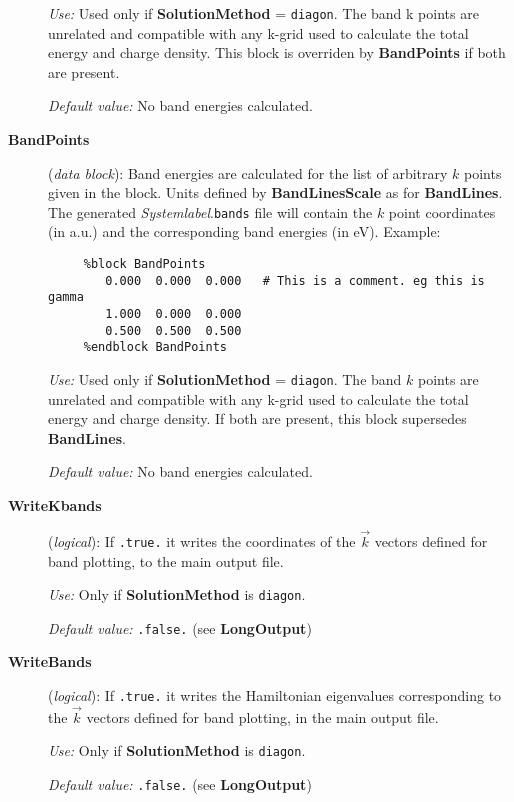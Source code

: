 \documentclass[11pt]{article}
\begin{document}
\begin{description}
{\it Use:} Used only if {\bf SolutionMethod} = {\tt diagon}.
The band k points are unrelated and compatible with any k-grid used
to calculate the total energy and charge density.
This block is overriden by {\bf BandPoints} if both are present.

{\it Default value:} No band energies calculated.

\item[{\bf BandPoints}] ({\it data block}):
Band energies are calculated for the list of arbitrary $k$ points
given in the block. Units defined by {\bf BandLinesScale} as
for {\bf BandLines}. The generated {\it Systemlabel}.{\tt bands} file
will contain the $k$ point coordinates (in a.u.) and the corresponding
band energies (in eV). Example:

\begin{verbatim}
     %block BandPoints
        0.000  0.000  0.000   # This is a comment. eg this is gamma
        1.000  0.000  0.000
        0.500  0.500  0.500
     %endblock BandPoints
\end{verbatim}

{\it Use:} Used only if {\bf SolutionMethod} = {\tt diagon}.
The band $k$ points are unrelated and compatible with any k-grid used
to calculate the total energy and charge density. If both are present, this
block supersedes {\bf BandLines}.

{\it Default value:} No band energies calculated.

\item[{\bf WriteKbands}] ({\it logical}):
If {\tt .true.} it writes the coordinates of the $\vec k$ vectors
defined for band plotting, to the main output file.

{\it Use:} Only if {\bf SolutionMethod} is {\tt diagon}.

{\it Default value:} {\tt .false.} (see {\bf LongOutput})


\item[{\bf WriteBands}] ({\it logical}):  If {\tt .true.} it
  writes the Hamiltonian eigenvalues corresponding to the $\vec k$
  vectors defined for band plotting, in the main output file.

{\it Use:} Only if {\bf SolutionMethod} is {\tt diagon}.

{\it Default value:} {\tt .false.} (see {\bf LongOutput})


\end{description}
\end{document}

